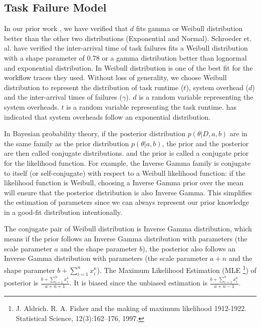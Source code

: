 \documentclass{IOS-Book-Article}
\begin{document}
\subsection{Task Failure Model}



In our prior work \cite{Chen2011}, we have verified that $d$ fits gamma or Weibull distribution better than the other two distributions (Exponential and Normal). Schroeder et. al. \cite{Schroeder2006} have verified the inter-arrival time of task failures fits a Weibull distribution with a shape parameter of 0.78 or a gamma distribution better than lognormal and exponential distribution. In \cite{Sun2003, Iosup2008} Weibull distribution is one of the best fit for the workflow traces they used.  Without loss of generality, we choose Weibull distribution to represent the distribution of task runtime ($t$), system overhead ($d$) and the inter-arrival times of failures ($\gamma$).  $d$ is a random variable representing the system overheads. $t$ is a random variable representing the task runtime. has indicated that system overheads follow an exponential distribution. 

In Bayesian probability theory, if the posterior distribution $p(\theta|D, a, b)$ are in the same family as the prior distribution $p(\theta|a, b)$, the prior and the posterior are then called conjugate distributions. and the prior is called a conjugate prior for the likelihood function. For example, the Inverse Gamma family is conjugate to itself (or self-conjugate) with respect to a Weibull likelihood function: if the likelihood function is Weibull, choosing a Inverse Gamma prior over the mean will ensure that the posterior distribution is also Inverse Gamma. This simplifies the estimation of parameters since we can always represent our prior knowledge in a good-fit distribution intentionally. 

The conjugate pair of Weibull distribution is Inverse Gamma distribution, which means if the prior follows an Inverse Gamma distribution with parameters (the scale parameter $a$ and the shape parameter $b$), the posterior also follows an Inverse Gamma distribution with parameters (the scale parameter $a+n$ and the shape parameter $\displaystyle b+\sum_{i=1}^n{x_i^\kappa}$). The Maximum Likelihood Estimation  (MLE \footnote{J. Aldrich. R. A. Fisher and the making of maximum likelihood 1912-1922. Statistical Science, 12(3):162–176, 1997.}) of posterior is $\displaystyle\frac{b+\displaystyle\sum_{i=1}^n{x_i^\kappa}}{a+n+1}$. It is biased since the unbiased estimation is $\displaystyle\frac{b+\displaystyle\sum_{i=1}^n{x_i^\kappa}}{a+n-1}$. 
\end{document}
